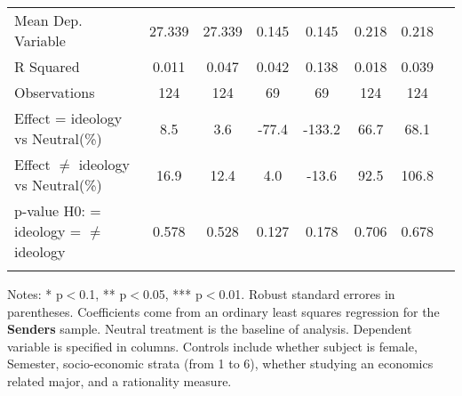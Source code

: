 \begin{table}[H]
{\begin{threeparttable}
\begin{tabular}{lccccccc}
\midrule
Mean Dep. Variable  &      27.339         &      27.339         &       0.145         &       0.145         &       0.218         &       0.218         \\
R Squared           &       0.011         &       0.047         &       0.042         &       0.138         &       0.018         &       0.039         \\
Observations        &         124         &         124         &          69         &          69         &         124         &         124         \\
\midrule
Effect = ideology vs Neutral(\%)&         8.5         &         3.6         &       -77.4         &      -133.2         &        66.7         &        68.1         \\
Effect $\neq$ ideology vs Neutral(\%)&        16.9         &        12.4         &         4.0         &       -13.6         &        92.5         &       106.8         \\
p-value H0: = ideology = $\neq$ ideology&       0.578         &       0.528         &       0.127         &       0.178         &       0.706         &       0.678         \\
\bottomrule[0.5pt]                                                                               \label{tab:table2}                                                                       \end{tabular}                                                                                                    \vspace{-13pt}                                                                                           \begin{tablenotes}[flushleft]{\setlength{\itemindent}{-3pt}}          \small                                                                                                           \item Notes: * p$<$0.1, ** p$<$0.05, *** p$<$0.01. Robust standard errores in parentheses. Coefficients come from an ordinary least squares regression for the \textbf{Senders} sample. Neutral treatment is the baseline of analysis. Dependent variable is specified in columns. Controls include whether subject is female, Semester, socio-economic strata (from 1 to 6), whether studying an economics related major, and a rationality measure.          \end{tablenotes}                                                                                         \end{threeparttable}                                                                             }                                                                                                                        \end{table}
